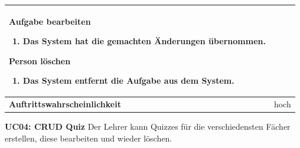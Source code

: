 \begin{tabularx}{\textwidth}{| X | X |}
		\textbf{Aufgabe bearbeiten}
		\begin{enumerate}
			\item Das System hat die gemachten Änderungen übernommen.
		\end{enumerate}
		
		\textbf{Person löschen}
		\begin{enumerate}
			\item Das System entfernt die Aufgabe aus dem System.
		\end{enumerate}	
		\\
	\hline
		\textbf{Auftrittswahrscheinlichkeit} & hoch \\
	\hline
\end{tabularx}


\textbf{UC04: CRUD Quiz} Der Lehrer kann Quizzes für die verschiedensten Fächer erstellen, diese bearbeiten und wieder löschen.

